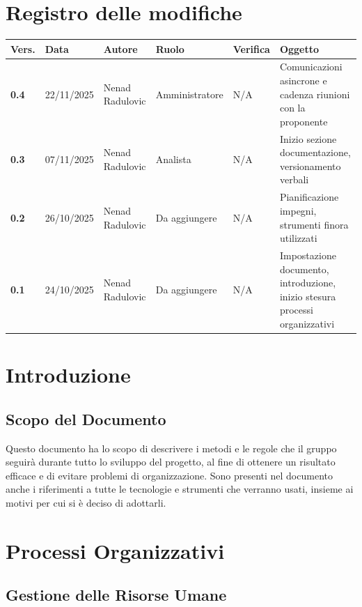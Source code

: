 \documentclass[a4paper,12pt]{article}
\begin{document}


\tableofcontents
\newpage

\section*{Registro delle modifiche}

\begin{tabularx}{\textwidth}{|l|l|X|l|X|X|}
    \hline
    \textbf{Vers.} & \textbf{Data} & \textbf{Autore} & \textbf{Ruolo} & \textbf{Verifica} & \textbf{Oggetto} \\
    \hline
    \textbf{0.4} & 22/11/2025 & Nenad Radulovic & Amministratore & N/A & Comunicazioni asincrone e cadenza riunioni con la proponente \\
    \textbf{0.3} & 07/11/2025 & Nenad Radulovic & Analista & N/A & Inizio sezione documentazione, versionamento verbali \\
    \textbf{0.2} & 26/10/2025 & Nenad Radulovic & Da aggiungere & N/A & Pianificazione impegni, strumenti finora utilizzati \\
    \textbf{0.1} & 24/10/2025 & Nenad Radulovic & Da aggiungere & N/A & Impostazione documento, introduzione, inizio stesura processi organizzativi \\
    \hline
\end{tabularx}

\newpage
\section{Introduzione}
\subsection{Scopo del Documento}
Questo documento ha lo scopo di descrivere i metodi e le regole che il gruppo seguirà durante tutto lo sviluppo del progetto, al fine di ottenere un risultato efficace e di evitare problemi di organizzazione. Sono presenti nel documento anche i riferimenti a tutte le tecnologie e strumenti che verranno usati, insieme ai motivi per cui si è deciso di adottarli.

\newpage
\section{Processi Organizzativi}


\subsection{Gestione delle Risorse Umane}
\end{document}

